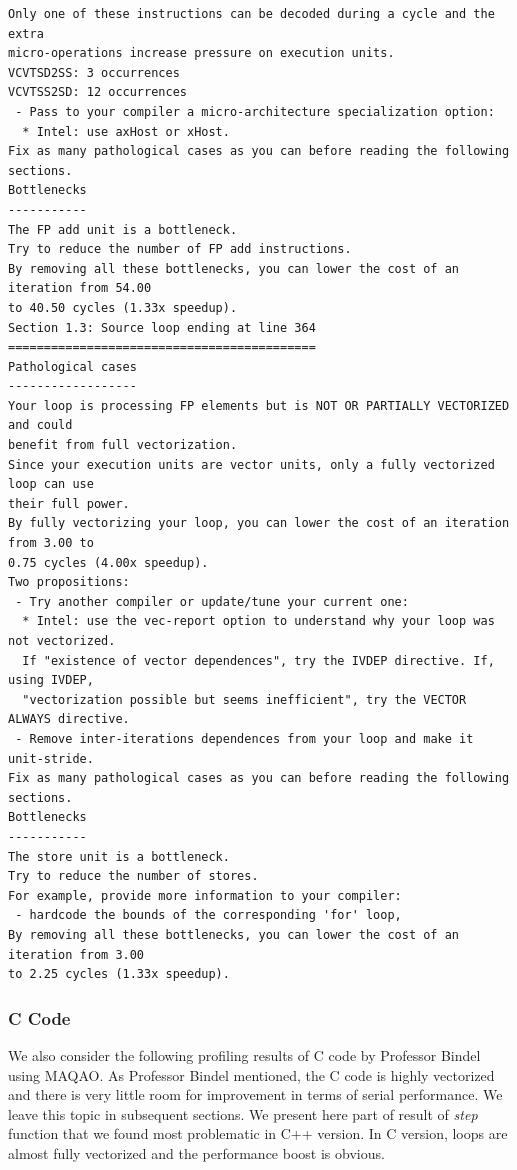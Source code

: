 \documentclass[12pt]{article}
\numberwithin{equation}{section}
\begin{document}
{\begin{lstlisting}
Only one of these instructions can be decoded during a cycle and the extra
micro-operations increase pressure on execution units.
VCVTSD2SS: 3 occurrences
VCVTSS2SD: 12 occurrences
 - Pass to your compiler a micro-architecture specialization option:
  * Intel: use axHost or xHost.
Fix as many pathological cases as you can before reading the following sections.
Bottlenecks
-----------
The FP add unit is a bottleneck.
Try to reduce the number of FP add instructions.
By removing all these bottlenecks, you can lower the cost of an iteration from 54.00
to 40.50 cycles (1.33x speedup).
Section 1.3: Source loop ending at line 364
===========================================
Pathological cases
------------------
Your loop is processing FP elements but is NOT OR PARTIALLY VECTORIZED and could
benefit from full vectorization.
Since your execution units are vector units, only a fully vectorized loop can use
their full power.
By fully vectorizing your loop, you can lower the cost of an iteration from 3.00 to
0.75 cycles (4.00x speedup).
Two propositions:
 - Try another compiler or update/tune your current one:
  * Intel: use the vec-report option to understand why your loop was not vectorized.
  If "existence of vector dependences", try the IVDEP directive. If, using IVDEP,
  "vectorization possible but seems inefficient", try the VECTOR ALWAYS directive.
 - Remove inter-iterations dependences from your loop and make it unit-stride.
Fix as many pathological cases as you can before reading the following sections.
Bottlenecks
-----------
The store unit is a bottleneck.
Try to reduce the number of stores.
For example, provide more information to your compiler:
 - hardcode the bounds of the corresponding 'for' loop,
By removing all these bottlenecks, you can lower the cost of an iteration from 3.00
to 2.25 cycles (1.33x speedup).
\end{lstlisting}
}

\subsubsection{C Code}

\normalsize
We also consider the following profiling results of C code by Professor Bindel using MAQAO. As Professor Bindel mentioned, the C code is highly vectorized and there is very little room for improvement in terms of serial performance. We leave this topic in subsequent sections. We present here part of result of \textit{step} function that we found most problematic in C++ version. In C version, loops are almost fully vectorized and the performance boost is obvious.
\end{document}
